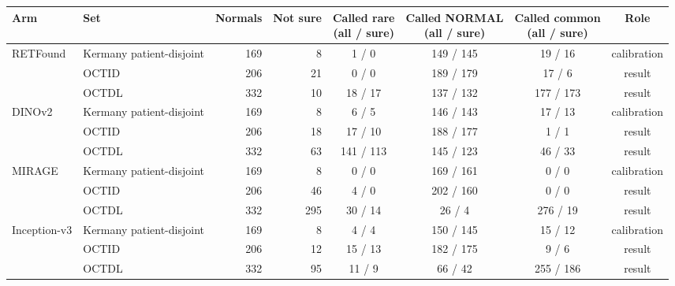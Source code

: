 \begin{tabular}{@{}llrrcccc@{}}
\toprule
Arm & Set & Normals & Not sure & \makecell{Called rare\\(all / sure)} & \makecell{Called NORMAL\\(all / sure)} & \makecell{Called common\\(all / sure)} & Role \\
\midrule
RETFound & Kermany patient-disjoint & 169 & 8 & 1 / 0 & 149 / 145 & 19 / 16 & calibration \\
 & OCTID & 206 & 21 & 0 / 0 & 189 / 179 & 17 / 6 & result \\
 & OCTDL & 332 & 10 & 18 / 17 & 137 / 132 & 177 / 173 & result \\
\addlinespace[2pt]
DINOv2 & Kermany patient-disjoint & 169 & 8 & 6 / 5 & 146 / 143 & 17 / 13 & calibration \\
 & OCTID & 206 & 18 & 17 / 10 & 188 / 177 & 1 / 1 & result \\
 & OCTDL & 332 & 63 & 141 / 113 & 145 / 123 & 46 / 33 & result \\
\addlinespace[2pt]
MIRAGE & Kermany patient-disjoint & 169 & 8 & 0 / 0 & 169 / 161 & 0 / 0 & calibration \\
 & OCTID & 206 & 46 & 4 / 0 & 202 / 160 & 0 / 0 & result \\
 & OCTDL & 332 & 295 & 30 / 14 & 26 / 4 & 276 / 19 & result \\
\addlinespace[2pt]
Inception-v3 & Kermany patient-disjoint & 169 & 8 & 4 / 4 & 150 / 145 & 15 / 12 & calibration \\
 & OCTID & 206 & 12 & 15 / 13 & 182 / 175 & 9 / 6 & result \\
 & OCTDL & 332 & 95 & 11 / 9 & 66 / 42 & 255 / 186 & result \\
\bottomrule
\end{tabular}
